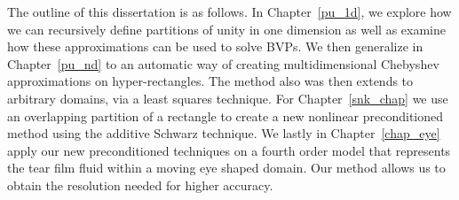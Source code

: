  The outline of this dissertation is as follows. In Chapter~\ref{pu_1d}, we explore how we can recursively define partitions of unity in one dimension as well as examine how these approximations can be used to solve BVPs. We then generalize in Chapter~\ref{pu_nd} to an automatic way of creating multidimensional Chebyshev approximations on hyper-rectangles. The method also was then extends to arbitrary domains, via a least squares technique. For Chapter~\ref{snk_chap} we use an overlapping partition of a rectangle to create a new nonlinear preconditioned method using the additive Schwarz technique. We lastly in Chapter~\ref{chap_eye} apply our new preconditioned techniques on a fourth order model that represents the tear film fluid within a moving eye shaped domain. Our method allows us to obtain the resolution needed for higher accuracy.

